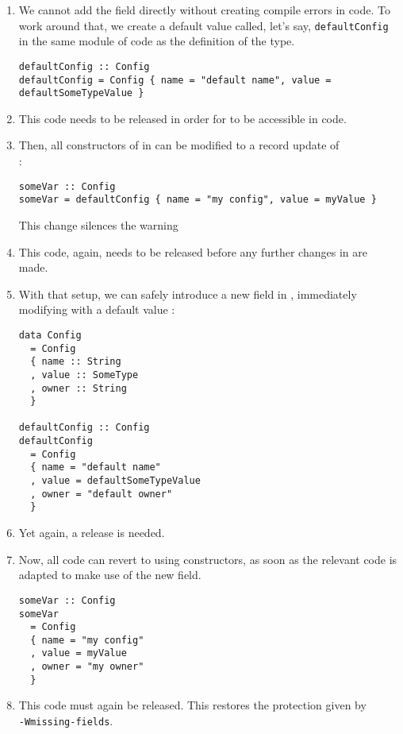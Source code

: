 \documentclass[en]{pracamgr}
\newcommand{\code}[1]{\lstinline[breaklines=true]{#1}}
\begin{document}
\begin{enumerate}
  \item We cannot add the field directly without creating compile errors in \user{} code. 
  To work around that, we create a default value called, let's say, \code{defaultConfig} in the same module of \infra{} code as 
  the definition of the type.\\
  \begin{minipage}{\linewidth}
    \begin{lstlisting}
defaultConfig :: Config
defaultConfig = Config { name = "default name", value = defaultSomeTypeValue }
    \end{lstlisting}
  \end{minipage}
  \item This code needs to be released in order for  to be accessible in \user{} code.
  \item Then, all constructors of \conf{} in \user{} can be modified to a record update of \\
  :\\
  \begin{minipage}{\linewidth}
    \begin{lstlisting}
someVar :: Config
someVar = defaultConfig { name = "my config", value = myValue }
    \end{lstlisting}
  \end{minipage}
  This change silences the warning 
  \item This code, again, needs to be released before any further changes in \infra{} are made.
  \item With that setup, we can safely introduce a new field in \infra{}, immediately modifying  with a default value :\\
  \begin{minipage}{\linewidth}
    \begin{lstlisting}
data Config 
  = Config
  { name :: String
  , value :: SomeType
  , owner :: String
  }

defaultConfig :: Config
defaultConfig 
  = Config 
  { name = "default name"
  , value = defaultSomeTypeValue
  , owner = "default owner" 
  }
    \end{lstlisting}
    \end{minipage}
  \item Yet again, a release is needed.
  \item Now, all \user{} code can revert to using constructors, as soon as the relevant code is adapted to make use of the 
  new field. \\
\begin{minipage}{\linewidth}
\begin{lstlisting}
someVar :: Config
someVar 
  = Config
  { name = "my config"
  , value = myValue
  , owner = "my owner"
  }
\end{lstlisting}
\end{minipage}

  \item This \user{} code must again be released. This restores the protection given by \\
  \code{-Wmissing-fields}.
\end{enumerate}
\end{document}
